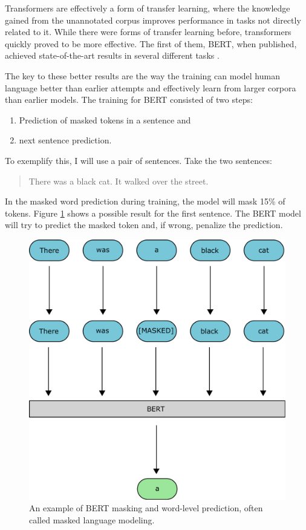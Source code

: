 \documentclass[nofilelist]{cslthse-msc}
\begin{document}
Transformers are effectively a form of transfer learning, where the knowledge gained from the unannotated corpus improves performance in tasks not directly related to it. While there were forms of transfer learning before, transformers quickly proved to be more effective. The first of them, BERT, when published, achieved state-of-the-art results in several different tasks \citep{DBLP:journals/corr/abs-1810-04805}.

The key to these better results are the way the training can model human language better than earlier attempts and effectively learn from larger corpora than earlier models. The training for BERT consisted of two steps:
\begin{enumerate}
    \item Prediction of masked tokens in a sentence and
    \item  next sentence prediction.
\end{enumerate}

To exemplify this, I will use a pair of sentences. Take the two sentences:
\begin{quote}
There was a black cat. It walked over the street.
\end{quote}
In the masked word prediction during training, the model will mask 15\% of tokens. Figure \ref{fig:BERTmasking} shows a possible result for the first sentence. The BERT model will try to predict the masked token and, if wrong, penalize the prediction.

\begin{figure}[ht]
    \centering
    \includegraphics[width=\textwidth/2]{BERTmasking.pdf}
    \caption{An example of BERT masking and word-level prediction, often called masked language modeling.}
    \label{fig:BERTmasking}
\end{figure}
\end{document}
